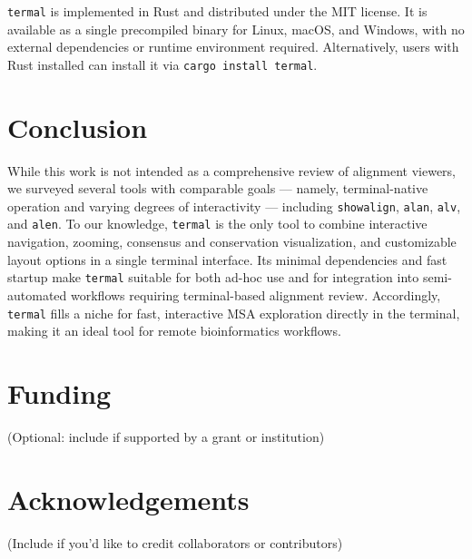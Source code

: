 \documentclass[11pt]{article}
\begin{document}
\texttt{termal} is implemented in Rust and distributed under the MIT license. It
is available as a single precompiled binary for Linux, macOS, and Windows, with
no external dependencies or runtime environment required. Alternatively, users
with Rust installed can install it via \texttt{cargo install termal}.

\section*{Conclusion}

While this work is not intended as a comprehensive review of alignment viewers,
we surveyed several tools with comparable goals — namely, terminal-native
operation and varying degrees of interactivity — including \texttt{showalign},
\texttt{alan}, \texttt{alv}, and \texttt{alen}.  To our knowledge,
\texttt{termal} is the only tool to combine interactive navigation, zooming,
consensus and conservation visualization, and customizable layout options in a
single terminal interface.  Its minimal dependencies and fast startup make
\texttt{termal} suitable for both ad-hoc use and for integration into
semi-automated workflows requiring terminal-based alignment review. Accordingly,
\texttt{termal} fills a niche for fast, interactive MSA exploration directly in
the terminal, making it an ideal tool for remote bioinformatics workflows.

\section*{Funding}

(Optional: include if supported by a grant or institution)

\section*{Acknowledgements}

(Include if you'd like to credit collaborators or contributors)


\end{document}
